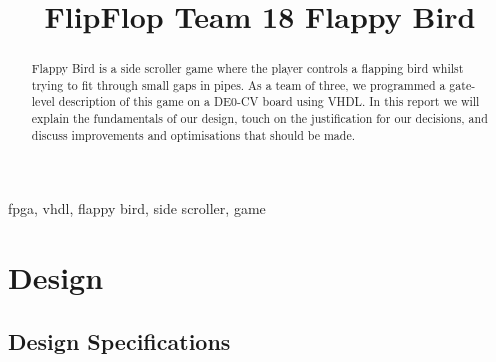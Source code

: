 \documentclass[conference]{IEEEtran}
\begin{document}
\title{FlipFlop Team 18 Flappy Bird}

\author{
	\and
	\and
}

\maketitle

\begin{abstract}
	Flappy Bird is a side scroller game where the player controls a flapping bird whilst trying to fit through small gaps in pipes. As a team of three, we programmed a gate-level description of this game on a DE0-CV board using VHDL. In this report we will explain the fundamentals of our design, touch on the justification for our decisions, and discuss improvements and optimisations that should be made.
\end{abstract}

\begin{IEEEkeywords}
	fpga, vhdl, flappy bird, side scroller, game
\end{IEEEkeywords}

\section{Design}

\subsection{Design Specifications}
\end{document}
